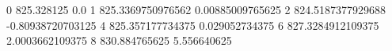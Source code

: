0 825.328125 0.0
1 825.3369750976562 0.00885009765625
2 824.5187377929688 -0.80938720703125
4 825.357177734375 0.029052734375
6 827.3284912109375 2.0003662109375
8 830.884765625 5.556640625
